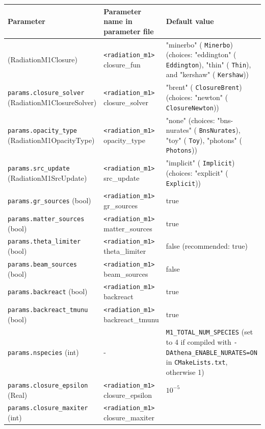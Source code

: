 \documentclass{article}
\newcommand{\var}[1]{%
  {\setlength{\fboxsep}{1.5pt}%
   \colorbox{varbg}{\textcolor{varfg}{\texttt{\small #1}}}}}
\begin{document}
\begin{tabularx}{\textwidth}{|
>{\raggedright\arraybackslash}X|
>{\raggedright\arraybackslash}X|
>{\raggedright\arraybackslash}X|}
  \hline
  \textbf{Parameter}&\textbf{Parameter name in parameter file}&\textbf{Default value}\\
  \hline
  \endfirsthead

  \endhead

  \var{params.closure\_type} (RadiationM1Closure)&\var{<radiation\_m1>} closure\_fun&"minerbo" (\var{Minerbo}) (choices: "eddington" (\var{Eddington}), "thin" (\var{Thin}), and "kershaw" (\var{Kershaw}))\\
  \hline
  \var{params.closure\_solver} (RadiationM1ClosureSolver)&\var{<radiation\_m1>} closure\_solver&"brent" (\var{ClosureBrent}) (choices: "newton" (\var{ClosureNewton}))\\
  \hline
  \var{params.opacity\_type} (RadiationM1OpacityType)&\var{<radiation\_m1>} opacity\_type&"none" (choices: "bns-nurates" (\var{BnsNurates}), "toy" (\var{Toy}), "photons" (\var{Photons}))\\
  \hline
  \var{params.src\_update} (RadiationM1SrcUpdate)&\var{<radiation\_m1>} src\_update&"implicit" (\var{Implicit}) (choices: "explicit" (\var{Explicit}))\\
  \hline
  \var{params.gr\_sources} (bool)&\var{<radiation\_m1>} gr\_sources&true\\
  \hline
  \var{params.matter\_sources} (bool)&\var{<radiation\_m1>} matter\_sources&true\\
  \hline
  \var{params.theta\_limiter} (bool)&\var{<radiation\_m1>} theta\_limiter&false (recommended: true)\\
  \hline
  \var{params.beam\_sources} (bool)&\var{<radiation\_m1>} beam\_sources&false\\
  \hline
  \var{params.backreact} (bool)&\var{<radiation\_m1>} backreact&true\\
  \hline
  \var{params.backreact\_tmunu} (bool)&\var{<radiation\_m1>} backreact\_tmunu&true\\
  \hline
  \var{params.nspecies} (int)&-&\var{M1\_TOTAL\_NUM\_SPECIES} (set to 4 if compiled with \var{-DAthena\_ENABLE\_NURATES=ON} in \var{CMakeLists.txt}, otherwise 1)\\
  \hline
  \var{params.closure\_epsilon} (Real)&\var{<radiation\_m1>} closure\_epsilon&$10^{-5}$\\
  \hline
  \var{params.closure\_maxiter} (int)&\var{<radiation\_m1>} closure\_maxiter&64\\

\end{tabularx}
\end{document}
